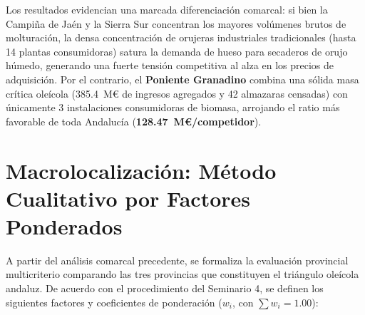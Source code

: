 \documentclass{report}
\begin{document}
Los resultados evidencian una marcada diferenciación comarcal: si bien la Campiña de Jaén y la Sierra Sur concentran los mayores volúmenes brutos de molturación, la densa concentración de orujeras industriales tradicionales (hasta \num{14} plantas consumidoras) satura la demanda de hueso para secaderos de orujo húmedo, generando una fuerte tensión competitiva al alza en los precios de adquisición. Por el contrario, el \textbf{Poniente Granadino} combina una sólida masa crítica oleícola (\num{385.4}~M€ de ingresos agregados y \num{42} almazaras censadas) con únicamente \num{3} instalaciones consumidoras de biomasa, arrojando el ratio más favorable de toda Andalucía (\textbf{\num{128.47}~M€/competidor}).

\section{Macrolocalización: Método Cualitativo por Factores Ponderados}
A partir del análisis comarcal precedente, se formaliza la evaluación provincial multicriterio comparando las tres provincias que constituyen el triángulo oleícola andaluz. De acuerdo con el procedimiento del Seminario 4, se definen los siguientes factores y coeficientes de ponderación ($w_i$, con $\sum w_i = 1.00$):
\end{document}
